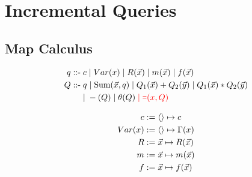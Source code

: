 \section{Incremental Queries}

\subsection{Map Calculus}

\def\calcsum{\mbox{Sum}}
\def\calceq{\mbox{{\tt =}}}
\def\calcgt{\mbox{{\tt >}}}
\def\calcgte{\mbox{{\tt >=}}}
\def\calclte{\mbox{{\tt <=}}}

\def \q{q}
\def \qq{Q}
\def \qqa{Q_1}
\def \qqb{Q_2}
\def \v#1{\mbox{#1}}
\def \vv#1{\mbox{{\tiny #1}}}

\begin{align*} 
\q \; \mbox{::-} &
  \;    c \;|\; Var(x)
  \;|\; R(\vec{x}) \;|\; m(\vec{x}) \;|\; f(\vec{x})
\\
\comment{
& \;|\; \theta(x,y)   \;|\; \theta_c(x)
  \;|\; \calceq(\q,y) \;|\; \calceq(x,y)
\\
}
\qq \; \mbox{::-} & \; \q \;|\; \calcsum(\vec{x}, \q)
    \;|\; \qqa(\vec{x}) + \qqb(\vec{y}) \;|\; \qqa(\vec{x}) * \qqb({\vec{y}}) \\
&   \;|\; -(\qq) \;|\; \theta(\qq) \todo{\;|\; \calceq(x,\qq)}
\end{align*}

\begin{align*}
c                   := & \; \tuple{} \mapsto c\\
Var(x)              := & \; \tuple{} \mapsto \Gamma(x)\\
R                   := & \; \vec{x} \mapsto R(\vec{x})\\
m                   := & \; \vec{x} \mapsto m(\vec{x}) \\
\comment{
\theta(x,y)         := & \; \tuple{x,y} \mapsto
                           \begin{cases}
                           1 \ldots x \; \theta \; y \\
                           0 \ldots \mbox{otherwise.}
                           \end{cases}\\
\theta_c(x)         := & \; \tuple{x} \mapsto
                           \begin{cases}
                           1 \ldots x \; \theta \; c \\
                           0 \ldots \mbox{otherwise.}
                           \end{cases}\\
\calceq(\q,y)       := & \; \tuple{y} \mapsto \q(\tuple{}) \\
\calceq(x,y)        := & \; \tuple{y} \mapsto \Gamma(x) \\
}
f                   := & \; \vec{x} \mapsto f(\vec{x}) \\
\end{align*}

